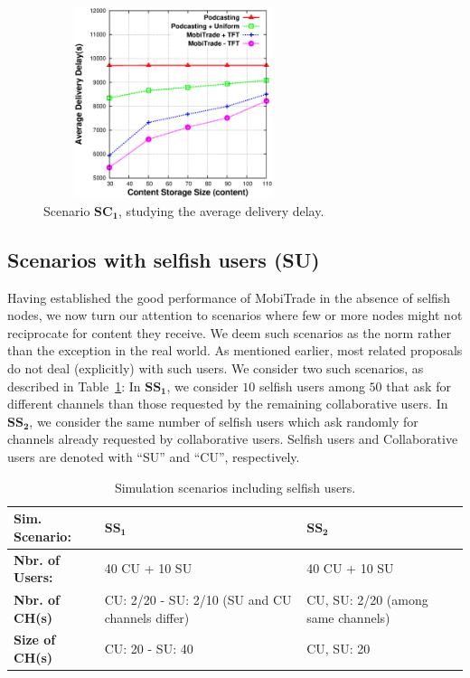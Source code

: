 \begin{figure}[!h]
  \begin{center}
    \includegraphics[width=3in,height=2.2in]{Chapitre5/fig12.eps}
  \end{center}
  \caption{Scenario $\mathbf{SC_1}$, studying the average delivery delay.}
  \label{avg-delay}
\end{figure}

\subsection{Scenarios with selfish users (SU)}
\label{selfish-scenario}

Having established the good performance of MobiTrade in the absence of selfish nodes, we now turn our attention to scenarios where few or more nodes might not reciprocate for content they receive. We deem such scenarios as the norm rather than the exception in the real world. As mentioned earlier, most related proposals do not deal (explicitly) with such users. We consider two such scenarios, as described in Table~\ref{table:m-sim-sce}: In $\mathbf{SS_{1}}$, we consider $10$ selfish users among $50$ that ask for different channels than those requested by the remaining collaborative users. In $\mathbf{SS_{2}}$, we consider the same number of selfish users which ask randomly for channels already requested by collaborative users. Selfish users and Collaborative users are denoted with ``SU'' and ``CU'', respectively.

\begin{table}[!h]
\vspace{-0.1in}
\caption{Simulation scenarios including selfish users.}
\centering
\label{table:m-sim-sce}
\footnotesize
\begin{tabular}{|p{3cm}|p{4cm}|p{4cm}|}
\hline
\bfseries Sim. Scenario: & $\mathbf{SS_1}$ & $\mathbf{SS_2}$\\
\hline
\bfseries Nbr. of Users: & 40 CU + 10 SU & 40 CU + 10 SU\\
\hline
\bfseries Nbr. of CH(s) & CU: 2/20 - SU: 2/10 (SU and CU channels differ) & CU, SU: 2/20 (among same channels) \\
\hline
\bfseries Size of CH(s) & CU: 20 - SU: 40  & CU, SU: 20 \\
\hline

\end{tabular}
\end{table}

